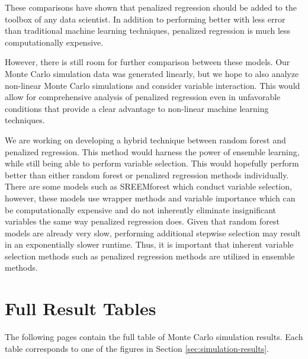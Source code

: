 \documentclass{article}
\begin{document}
These comparisons have shown that penalized regression should be added to the toolbox of any data scientist. In addition to performing better with less error than traditional machine learning techniques, penalized regression is much less computationally expensive.

However, there is still room for further comparison between these models. Our Monte Carlo simulation data was generated linearly, but we hope to also analyze non-linear Monte Carlo simulations and consider variable interaction. This would allow for comprehensive analysis of penalized regression even in unfavorable conditions that provide a clear advantage to non-linear machine learning techniques. 

We are working on developing a hybrid technique between random forest and penalized regression. This method would harness the power of ensemble learning, while still being able to perform variable selection. This would hopefully perform better than either random forest or penalized regression methods individually. There are some models such as SREEMforest \cite{capitaine2021random} which conduct variable selection, however, these models use wrapper methods and variable importance which can be computationally expensive and do not inherently eliminate insignificant variables the same way penalized regression does. Given that random forest models are already very slow, performing additional stepwise selection may result in an exponentially slower runtime. Thus, it is important that inherent variable selection methods such as penalized regression methods are utilized in ensemble methods.


\newpage



\newpage
\appendix
\section{Full Result Tables}\label{app:full-results}
The following pages contain the full table of Monte Carlo simulation results. Each table corresponds to one of the figures in Section \ref{sec:simulation-results}.

\setlength{\tabcolsep}{3pt}
\end{document}
